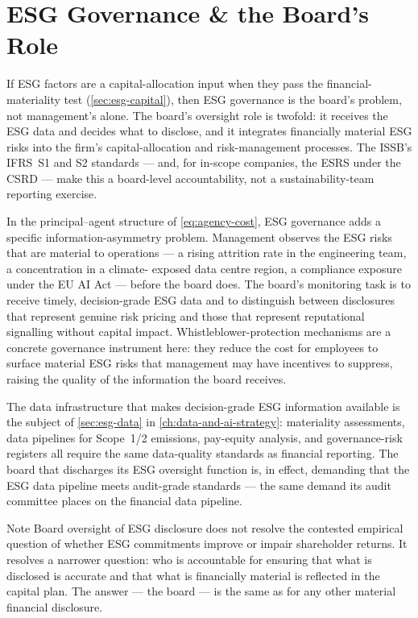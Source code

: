 \section{ESG Governance \& the Board's Role}\label{sec:esg-governance}

If ESG factors are a capital-allocation input when they pass the financial-materiality test
(\cref{sec:esg-capital}), then ESG governance is the board's problem, not management's alone.
The board's oversight role is twofold: it receives the ESG data and decides what to disclose,
and it integrates financially material ESG risks into the firm's capital-allocation and
risk-management processes. The ISSB's IFRS~S1 and S2 standards --- and, for in-scope companies,
the ESRS under the CSRD --- make this a board-level accountability, not a sustainability-team
reporting exercise.

In the principal--agent structure of \cref{eq:agency-cost}, ESG governance adds a specific
information-asymmetry problem. Management observes the ESG risks that are material to
operations --- a rising attrition rate in the engineering team, a concentration in a climate-
exposed data centre region, a compliance exposure under the EU AI Act --- before the board does.
The board's monitoring task is to receive timely, decision-grade ESG data and to distinguish
between disclosures that represent genuine risk pricing and those that represent reputational
signalling without capital impact. Whistleblower-protection mechanisms are a concrete governance
instrument here: they reduce the cost for employees to surface material ESG risks that management
may have incentives to suppress, raising the quality of the information the board receives.

The data infrastructure that makes decision-grade ESG information available is the subject of
\cref{sec:esg-data} in \cref{ch:data-and-ai-strategy}: materiality assessments, data pipelines
for Scope~1/2 emissions, pay-equity analysis, and governance-risk registers all require the
same data-quality standards as financial reporting. The board that discharges its ESG oversight
function is, in effect, demanding that the ESG data pipeline meets audit-grade standards --- the
same demand its audit committee places on the financial data pipeline.

\begin{admonition}{Note}
Board oversight of ESG disclosure does not resolve the contested empirical question of whether
ESG commitments improve or impair shareholder returns. It resolves a narrower question: who is
accountable for ensuring that what is disclosed is accurate and that what is financially material
is reflected in the capital plan. The answer --- the board --- is the same as for any other
material financial disclosure.
\end{admonition}

